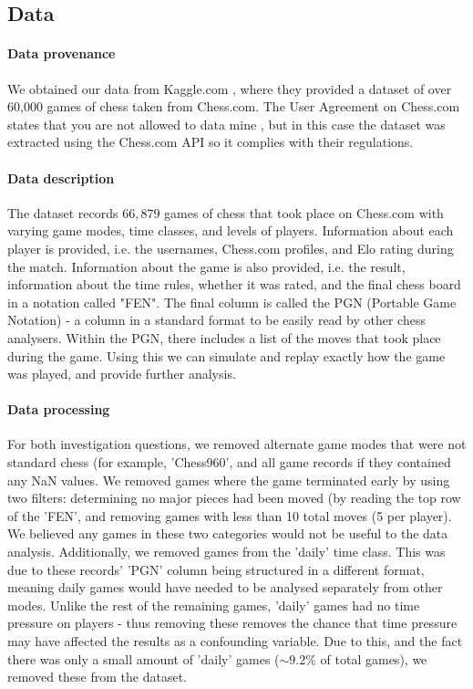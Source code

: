 \documentclass[10pt,a4paper]{article}
\begin{document}
\begin{multicols}{2}
\section{Data}


\paragraph{Data provenance}
We obtained our data from Kaggle.com \cite{Kaggle}, where they provided a dataset of over 60,000 games of chess taken from Chess.com. The User Agreement on Chess.com states that you are not allowed to data mine \cite{ChessT&C}, but in this case the dataset was extracted using the Chess.com API so it complies with their regulations.


\paragraph{Data description}
The dataset records $66,879$ games of chess that took place on Chess.com with varying game modes, time classes, and levels of players. Information about each player is provided, i.e. the usernames, Chess.com profiles, and Elo rating during the match. Information about the game is also provided, i.e. the result, information about the time rules, whether it was rated, and the final chess board in a notation called "FEN". The final column is called the PGN (Portable Game Notation) - a column in a standard format to be easily read by other chess analysers. Within the PGN, there includes a list of the moves that took place during the game. Using this we can simulate and replay exactly how the game was played, and provide further analysis.


\paragraph{Data processing}
For both investigation questions, we removed alternate game modes that were not standard chess (for example, 'Chess960', and all game records if they contained any NaN values. We removed games where the game terminated early by using two filters: determining no major pieces had been moved (by reading the top row of the 'FEN', and removing games with less than 10 total moves (5 per player). We believed any games in these two categories would not be useful to the data analysis. Additionally, we removed games from the 'daily' time class. This was due to these records' 'PGN' column being structured in a different format, meaning daily games would have needed to be analysed separately from other modes. Unlike the rest of the remaining games, 'daily' games had no time pressure on players - thus removing these removes the chance that time pressure may have affected the results as a confounding variable. Due to this, and the fact there was only a small amount of 'daily' games ($\sim9.2\%$ of total games), we removed these from the dataset.\newline


\end{multicols}
\end{document}
